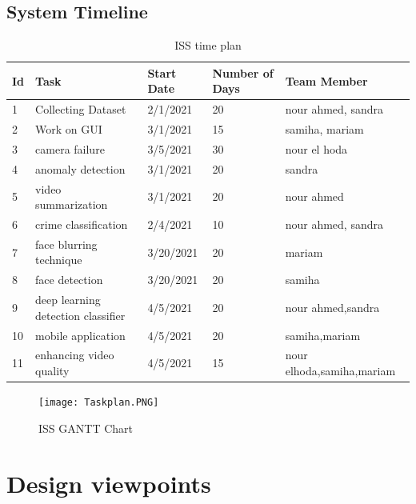 \documentclass[12pt]{article}
\begin{document}
\subsection {System Timeline}

\begin{table}[htbp]
\centering
\caption{ISS time plan}
\label{tab:Time Plan}


\begin{tabular}{|l|l|l|l|l|}
\hline
Id & Task               & Start Date & Number of Days & Team Member \\ \hline
1  & Collecting Dataset    & 2/1/2021 & 20           & nour ahmed, sandra        \\ \hline
2  & Work on GUI        & 3/1/2021 & 15             & samiha, mariam        \\ \hline
3  & camera failure    & 3/5/2021 & 30              & nour el hoda          \\ \hline
4  &  anomaly detection & 3/1/2021 &20             & sandra    \\ \hline
5  & video summarization     & 3/1/2021 & 20             & nour ahmed           \\ \hline

6 & crime classification     & 2/4/2021 & 10    & nour ahmed, sandra          \\ \hline
7 &   face blurring technique  & 3/20/2021 & 20             & mariam     \\ \hline
8 &   face detection    & 3/20/2021 & 20             & samiha    \\ \hline
9 &  deep learning detection classifier    & 4/5/2021 & 20             & nour ahmed,sandra    \\ \hline
10 & mobile application    & 4/5/2021 & 20             & samiha,mariam    \\ \hline
11 & enhancing video quality   & 4/5/2021 & 15             & nour elhoda,samiha,mariam          \\ \hline

\hline
\end{tabular}
\end{table}

\begin{figure}[htbp]
\centering
\texttt{[image: Taskplan.PNG]}
\caption{ISS GANTT Chart}
\label{fig:GANTT Chart}
\end{figure}

\clearpage
\section{Design viewpoints} 
\end{document}
